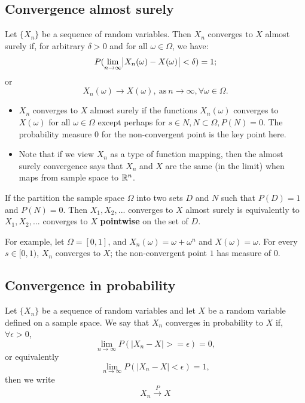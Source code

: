 \begin{refsection}
\subsection{Convergence almost surely}
\begin{definition}
\cite[308]{grimmett2001probability}Let $\{X_n\}$ be a sequence of random variables. Then $X_n$ converges to $X$ almost surely if, for arbitrary $\delta > 0$ and for all $\omega \in \Omega$, we have:
$$P(\lim_{n\rightarrow \infty }\abs{X_n(\omega) - X(\omega)}<\delta) = 1;$$
or
$$X_n(\omega) \to X(\omega), ~\text{as}~ n\to \infty,\forall \omega \in \Omega.$$
\end{definition}

\begin{remark}[interpretation]\hfill
\begin{itemize}
	\item $X_n$ converges to $X$ almost surely if the functions $X_n(\omega)$ converges to $X(\omega)$ for all $\omega \in \Omega$ except perhaps for $s\in N,N\subset \Omega,P(N)=0$. The probability measure 0 for the non-convergent point is the key point here. 
	\item Note that if we view $X_n$ as a type of function mapping, then the almost surely convergence says that $X_n$ and $X$ are the same (in the limit) when maps from sample space to $\mathbb{R}^n$.
\end{itemize}
\end{remark}

\begin{remark}
If the partition the sample space $\Omega$ into two sets $D$ and $N$ such that $P(D) = 1$ and $P(N) = 0$. Then $X_1,X_2,...$ converges to $X$ almost surely is equivalently to $X_1,X_2,...$ converges to $X$ \textbf{pointwise} on the set of $D$. 	
\end{remark}

\begin{example}
For example, let $\Omega = [0,1]$, and $X_n(\omega) = \omega + \omega^n$ and $X(\omega) = \omega$. For every $s\in [0,1)$, $X_n$ converges to $X$; the non-convergent point $1$ has measure of 0.
\end{example}


\subsection{Convergence in probability }
\begin{definition}
\cite{hoggintroduction}Let $\{X_n\}$ be a sequence of random variables and let $X$ be a random variable defined on a sample space. We say that $X_n$ converges in probability to $X$ if, $\forall \epsilon > 0 $, $$\lim_{n\rightarrow \infty} P(|X_n-X|>=\epsilon) = 0,$$ or equivalently $$\lim_{n\rightarrow \infty} P(|X_n-X|<\epsilon) = 1,$$
then we write $$X_n \xrightarrow[ ]{P} X $$
\end{definition}


\end{refsection}
